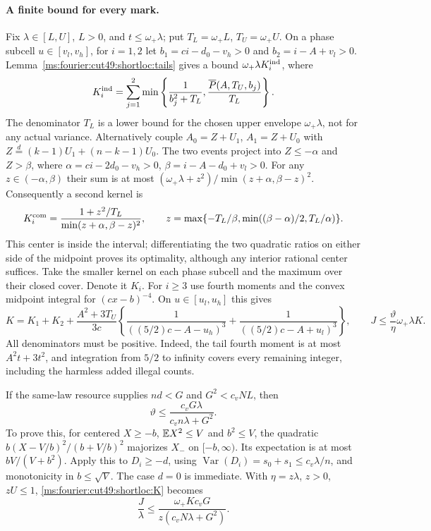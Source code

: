\paragraph{A finite bound for every mark.}
Fix $\lambda\in[L,U]$, $L>0$, and $t\le\omega_+\lambda$; put
$T_L=\omega_+L$, $T_U=\omega_+U$. On a phase subcell $u\in[v_l,v_h]$,
for $i=1,2$ let $b_1=ci-d_0-v_h>0$ and $b_2=i-A+v_l>0$.
Lemma~\ref{ms:fourier:cut49:shortloc:tails} gives a bound $\omega_+\lambda K_i^{\rm ind}$,
where
\[
 K_i^{\rm ind}=\sum_{j=1}^2\min\left\{\frac1{b_j^2+T_L},
                          \frac{\overline P(A,T_U,b_j)}{T_L}\right\}.
\]
The denominator $T_L$ is a lower bound for the chosen upper envelope
$\omega_+\lambda$, not for any actual variance.
Alternatively couple $A_0=Z+U_1$, $A_1=Z+U_0$ with
$Z\overset d=(k-1)U_1+(n-k-1)U_0$. The two events project into
$Z\le-\alpha$ and $Z>\beta$, where
$\alpha=ci-2d_0-v_h>0$, $\beta=i-A-d_0+v_l>0$.
For any $z\in(-\alpha,\beta)$ their sum is at most
$(\omega_+\lambda+z^2)/\min(z+\alpha,\beta-z)^2$.
Consequently a second kernel is
\[
 K_i^{\rm com}=\frac{1+z^2/T_L}{\min(z+\alpha,\beta-z)^2},\qquad
 z=\max\{-T_L/\beta,\min((\beta-\alpha)/2,T_L/\alpha)\}.
\]
This center is inside the interval; differentiating the two quadratic
ratios on either side of the midpoint proves its optimality, although
any interior rational center suffices. Take the smaller kernel on each
phase subcell and the maximum over their closed cover. Denote it $K_i$.
For $i\ge3$ use fourth moments and the convex midpoint integral for
$(cx-b)^{-4}$. On $u\in[u_l,u_h]$ this gives
\begin{equation}\label{ms:fourier:cut49:shortloc:K}
 K=K_1+K_2+\frac{A^2+3T_U}{3c}
  \left\{\frac1{((5/2)c-A-u_h)^3}
                 +\frac1{((5/2)c-A+u_l)^3}\right\},\qquad
 J\le\frac{\vartheta}{\eta}\omega_+\lambda K.
\end{equation}
All denominators must be positive. Indeed, the tail fourth moment is at
most $A^2t+3t^2$, and integration from $5/2$ to infinity covers every
remaining integer, including the harmless added illegal counts.

If the same-law resource supplies $nd<G$ and
$G^2<c_vNL$, then
\begin{equation}\label{ms:fourier:cut49:shortloc:theta}
 \vartheta\le\frac{c_vG\lambda}{c_vn\lambda+G^2}.
\end{equation}
To prove this, for centered $X\ge-b$, $\mathbb E X^2\le V$ and $b^2\le V$,
the quadratic $b(X-V/b)^2/(b+V/b)^2$ majorizes $X_-$ on $[-b,\infty)$.
Its expectation is at most $bV/(V+b^2)$. Apply this to $D_i\ge-d$,
using $\operatorname{Var}(D_i)=s_0+s_1\le c_v\lambda/n$, and monotonicity
in $b\le\sqrt V$. The case $d=0$ is immediate. With $\eta=z\lambda$,
$z>0$, $zU\le1$, \eqref{ms:fourier:cut49:shortloc:K} becomes
\begin{equation}\label{ms:fourier:cut49:shortloc:Jfinal}
 \frac J\lambda\le\frac{\omega_+Kc_vG}{z(c_vN\lambda+G^2)}.
\end{equation}

